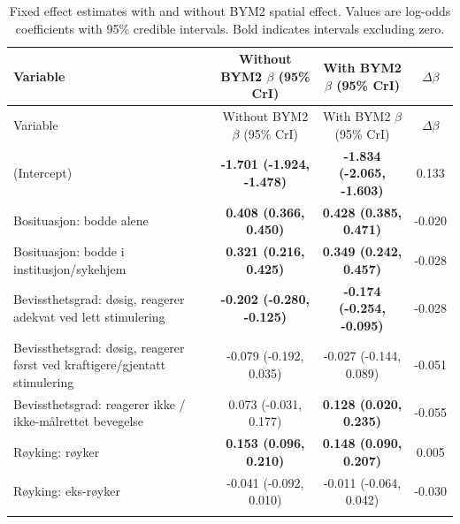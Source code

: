 \begin{longtable}{p{5.2cm}ccc}
  \caption{Fixed effect estimates with and without BYM2 spatial effect. Values are log-odds coefficients with 95\% credible intervals. Bold indicates intervals excluding zero.} \\
  \toprule
  Variable                                                                   & Without BYM2 $\beta$ (95\% CrI)  & With BYM2 $\beta$ (95\% CrI)     & $\Delta\beta$               \\
  \midrule
  \endfirsthead
  \toprule
  Variable                                                                   & Without BYM2 $\beta$ (95\% CrI)  & With BYM2 $\beta$ (95\% CrI)     & $\Delta\beta$               \\
  \midrule
  \endhead
  \bottomrule
  \endfoot
  (Intercept)                                                                & \textbf{-1.701 (-1.924, -1.478)} & \textbf{-1.834 (-2.065, -1.603)} & 0.133                       \\
  Bosituasjon: bodde alene                                                   & \textbf{0.408 (0.366, 0.450)}    & \textbf{0.428 (0.385, 0.471)}    & -0.020                      \\
  Bosituasjon: bodde i institusjon/sykehjem                                  & \textbf{0.321 (0.216, 0.425)}    & \textbf{0.349 (0.242, 0.457)}    & -0.028                      \\
  Bevissthetsgrad: døsig, reagerer adekvat ved lett stimulering              & \textbf{-0.202 (-0.280, -0.125)} & \textbf{-0.174 (-0.254, -0.095)} & -0.028                      \\
  Bevissthetsgrad: døsig, reagerer først ved kraftigere/gjentatt stimulering & -0.079 (-0.192, 0.035)           & -0.027 (-0.144, 0.089)           & -0.051                      \\
  Bevissthetsgrad: reagerer ikke / ikke-målrettet bevegelse                  & 0.073 (-0.031, 0.177)            & \textbf{0.128 (0.020, 0.235)}    & -0.055                      \\
  Røyking: røyker                                                            & \textbf{0.153 (0.096, 0.210)}    & \textbf{0.148 (0.090, 0.207)}    & 0.005                       \\
  Røyking: eks-røyker                                                        & -0.041 (-0.092, 0.010)           & -0.011 (-0.064, 0.042)           & -0.030                      \\\\

\end{longtable}
